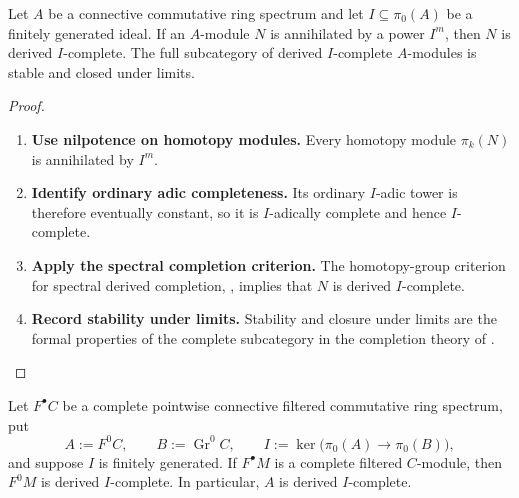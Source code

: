 \begin{lemma}
\label{lem:nilpotent-modules-derived-complete}
Let \(A\) be a connective commutative ring spectrum and let
\(I\subseteq\pi_0(A)\) be a finitely generated ideal. If an \(A\)-module
\(N\) is annihilated by a power \(I^m\), then \(N\) is derived
\(I\)-complete. The full subcategory of derived \(I\)-complete \(A\)-modules
is stable and closed under limits.
\end{lemma}

\begin{proof}
\leavevmode
\begin{enumerate}[label=\textup{(\arabic*)}]
    \item \textbf{Use nilpotence on homotopy modules.}
    Every homotopy module \(\pi_k(N)\) is annihilated by \(I^m\).
    \item \textbf{Identify ordinary adic completeness.}
    Its ordinary
    \(I\)-adic tower is therefore eventually constant, so it is \(I\)-adically
    complete and hence \(I\)-complete.
    \item \textbf{Apply the spectral completion criterion.}
    The homotopy-group criterion for spectral
    derived completion,
    \cite[Theorem~7.3.4.1]{LurieSAG}, implies that \(N\) is derived
    \(I\)-complete.
    \item \textbf{Record stability under limits.}
    Stability and closure under limits are the formal properties
    of the complete subcategory in the completion theory of
    \cite[Section~7.3.3]{LurieSAG}.
\end{enumerate}
\end{proof}

\begin{lemma}
\label{lem:filtered-completeness-augmentation-kernel}
Let \(F^\bullet C\) be a complete pointwise connective filtered commutative
ring spectrum, put
\[
    A:=F^0C,
    \qquad
    B:=\operatorname{Gr}^0C,
    \qquad
    I:=\ker\bigl(\pi_0(A)\to\pi_0(B)\bigr),
\]
and suppose \(I\) is finitely generated. If \(F^\bullet M\) is a complete
filtered \(C\)-module, then \(F^0M\) is derived \(I\)-complete. In
particular, \(A\) is derived \(I\)-complete.
\end{lemma}

